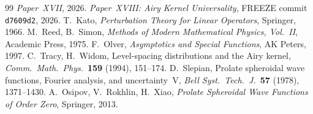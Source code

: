 \documentclass[12pt,a4paper]{amsart}
\theoremstyle{definition}
\begin{document}
\begin{thebibliography}{99}
 \textit{Paper~XVII}, 2026.
 \textit{Paper~XVIII: Airy Kernel Universality},
  FREEZE commit \texttt{d7609d2}, 2026.
 T.~Kato,
  \textit{Perturbation Theory for Linear Operators}, Springer, 1966.
 M.~Reed, B.~Simon,
  \textit{Methods of Modern Mathematical Physics, Vol.~II},
  Academic Press, 1975.
 F.~Olver,
  \textit{Asymptotics and Special Functions}, AK Peters, 1997.
 C.~Tracy, H.~Widom,
  Level-spacing distributions and the Airy kernel,
  \textit{Comm.\ Math.\ Phys.}\ \textbf{159} (1994), 151--174.
 D.~Slepian,
  Prolate spheroidal wave functions, Fourier analysis, and
  uncertainty~V,
  \textit{Bell Syst.\ Tech.\ J.}\ \textbf{57} (1978), 1371--1430.
 A.~Osipov, V.~Rokhlin, H.~Xiao,
  \textit{Prolate Spheroidal Wave Functions of Order Zero},
  Springer, 2013.
\end{thebibliography}
\end{document}
